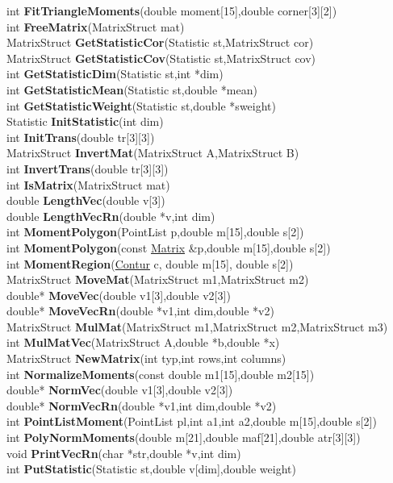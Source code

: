 \documentclass[10pt,titlepage]{article}
\def\functionlistentry#1#2#3#4#5#6{\noindent #1 {\bf #2}(#3) \dotfill #6\\}
\begin{document}
{{\functionlistentry{int}{FitTriangleMoments}{double moment[15],double corner[3][2]}{1622}{obsolet}{}
\functionlistentry{int}{FreeMatrix}{MatrixStruct mat}{1576}{obsolet}{}
\functionlistentry{MatrixStruct}{GetStatisticCor}{Statistic st,MatrixStruct cor}{1600}{obsolet}{}
\functionlistentry{MatrixStruct}{GetStatisticCov}{Statistic st,MatrixStruct cov}{1599}{obsolet}{}
\functionlistentry{int}{GetStatisticDim}{Statistic st,int *dim}{1596}{obsolet}{}
\functionlistentry{int}{GetStatisticMean}{Statistic st,double *mean}{1598}{obsolet}{}
\functionlistentry{int}{GetStatisticWeight}{Statistic st,double *sweight}{1597}{obsolet}{}
\functionlistentry{Statistic}{InitStatistic}{int dim}{1594}{obsolet}{}
\functionlistentry{int}{InitTrans}{double tr[3][3]}{1584}{obsolet}{}
\functionlistentry{MatrixStruct}{InvertMat}{MatrixStruct A,MatrixStruct B}{1582}{obsolet}{}
\functionlistentry{int}{InvertTrans}{double tr[3][3]}{1588}{obsolet}{}
\functionlistentry{int}{IsMatrix}{MatrixStruct mat}{1577}{obsolet}{}
\functionlistentry{double}{LengthVec}{double v[3]}{1557}{obsolet}{}
\functionlistentry{double}{LengthVecRn}{double *v,int dim}{1567}{obsolet}{}
\functionlistentry{int}{MomentPolygon}{PointList p,double m[15],double s[2]}{1603}{obsolet}{}
\functionlistentry{int}{MomentPolygon}{const \hyperlink{Matrix}{Matrix} \&p,double m[15],double s[2]}{1604}{obsolet}{}
\functionlistentry{int}{MomentRegion}{\hyperlink{Contur}{Contur} c, double m[15], double s[2]}{1606}{obsolet}{}
\functionlistentry{MatrixStruct}{MoveMat}{MatrixStruct m1,MatrixStruct m2}{1578}{obsolet}{}
\functionlistentry{double*}{MoveVec}{double v1[3],double v2[3]}{1556}{obsolet}{}
\functionlistentry{double*}{MoveVecRn}{double *v1,int dim,double *v2}{1566}{obsolet}{}
\functionlistentry{MatrixStruct}{MulMat}{MatrixStruct m1,MatrixStruct m2,MatrixStruct m3}{1580}{obsolet}{}
\functionlistentry{int}{MulMatVec}{MatrixStruct A,double *b,double *x}{1581}{obsolet}{}
\functionlistentry{MatrixStruct}{NewMatrix}{int typ,int rows,int columns}{1575}{obsolet}{}
\functionlistentry{int}{NormalizeMoments}{const double m1[15],double m2[15]}{1614}{obsolet}{}
\functionlistentry{double*}{NormVec}{double v1[3],double v2[3]}{1560}{obsolet}{}
\functionlistentry{double*}{NormVecRn}{double *v1,int dim,double *v2}{1570}{obsolet}{}
\functionlistentry{int}{PointListMoment}{PointList pl,int a1,int a2,double m[15],double s[2]}{1605}{obsolet}{}
\functionlistentry{int}{PolyNormMoments}{double m[21],double maf[21],double atr[3][3]}{1618}{obsolet}{}
\functionlistentry{void}{PrintVecRn}{char *str,double *v,int dim}{1574}{obsolet}{}
\functionlistentry{int}{PutStatistic}{Statistic st,double v[dim],double weight}{1595}{obsolet}{}
}}
\end{document}
